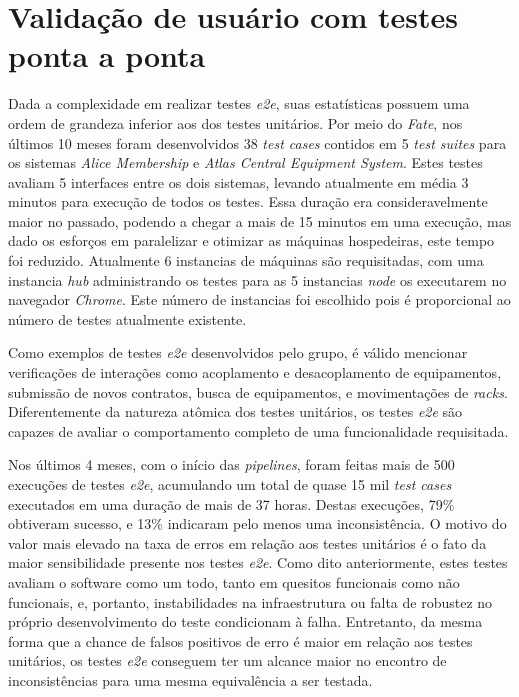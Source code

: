 \hypertarget{fate-resultados}{%
\section{Validação de usuário com testes ponta a ponta}\label{fate-resultados}}

Dada a complexidade em realizar testes \emph{e2e}, suas estatísticas possuem uma ordem de grandeza inferior aos dos testes unitários. Por meio do \emph{Fate}, nos últimos 10 meses foram desenvolvidos 38 \emph{test cases} contidos em 5 \emph{test suites} para os sistemas \emph{Alice Membership} e \emph{Atlas Central Equipment System}. Estes testes avaliam 5 interfaces entre os dois sistemas, levando atualmente em média 3 minutos para execução de todos os testes. Essa duração era consideravelmente maior no passado, podendo a chegar a mais de 15 minutos em uma execução, mas dado os esforços em paralelizar e otimizar as máquinas hospedeiras, este tempo foi reduzido. Atualmente 6 instancias de máquinas são requisitadas, com uma instancia \emph{hub} administrando os testes para as 5 instancias \emph{node} os executarem no navegador \emph{Chrome}. Este número de instancias foi escolhido pois é proporcional ao número de testes atualmente existente.

Como exemplos de testes \emph{e2e} desenvolvidos pelo grupo, é válido mencionar verificações de interações como acoplamento e desacoplamento de equipamentos, submissão de novos contratos, busca de equipamentos, e movimentações de \emph{racks}. Diferentemente da natureza atômica dos testes unitários, os testes \emph{e2e} são capazes de avaliar o comportamento completo de uma funcionalidade requisitada.

Nos últimos 4 meses, com o início das \emph{pipelines}, foram feitas mais de 500 execuções de testes \emph{e2e}, acumulando um total de quase 15 mil \emph{test cases} executados em uma duração de mais de 37 horas. Destas execuções, 79\% obtiveram sucesso, e 13\% indicaram pelo menos uma inconsistência. O motivo do valor mais elevado na taxa de erros em relação aos testes unitários é o fato da maior sensibilidade presente nos testes \emph{e2e}. Como dito anteriormente, estes testes avaliam o software como um todo, tanto em quesitos funcionais como não funcionais, e, portanto, instabilidades na infraestrutura ou falta de robustez no próprio desenvolvimento do teste condicionam à falha. Entretanto, da mesma forma que a chance de falsos positivos de erro é maior em relação aos testes unitários, os testes \emph{e2e} conseguem ter um alcance maior no encontro de inconsistências para uma mesma equivalência a ser testada.

